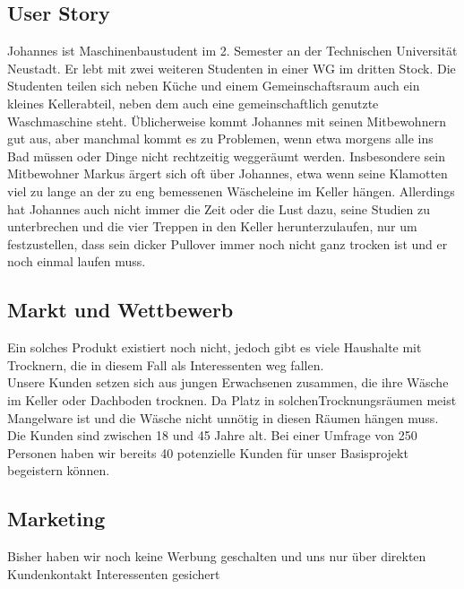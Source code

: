 \subsection{User Story}
	Johannes ist Maschinenbaustudent im 2. Semester an der Technischen Universität Neustadt. Er lebt mit zwei weiteren Studenten in einer WG im dritten Stock. Die Studenten teilen sich neben Küche und einem Gemeinschaftsraum auch ein kleines Kellerabteil, neben dem auch eine gemeinschaftlich genutzte Waschmaschine steht. Üblicherweise kommt Johannes mit seinen Mitbewohnern gut aus, aber manchmal kommt es zu Problemen, wenn etwa morgens alle ins Bad müssen oder Dinge nicht rechtzeitig weggeräumt werden. Insbesondere sein Mitbewohner Markus ärgert sich oft über Johannes, etwa wenn seine Klamotten viel zu lange an der zu eng bemessenen Wäscheleine im Keller hängen. Allerdings hat Johannes auch nicht immer die Zeit oder die Lust dazu, seine Studien zu unterbrechen und die vier Treppen in den Keller herunterzulaufen, nur um festzustellen, dass sein dicker Pullover immer noch nicht ganz trocken ist und er noch einmal laufen muss.

\subsection{Markt und Wettbewerb}
	Ein solches Produkt existiert noch nicht, jedoch gibt es viele Haushalte mit Trocknern, die in diesem Fall als Interessenten weg fallen. \\

	Unsere Kunden setzen sich aus jungen Erwachsenen zusammen, die ihre Wäsche im Keller oder Dachboden trocknen. Da Platz in solchenTrocknungsräumen meist Mangelware ist und die Wäsche nicht unnötig in diesen Räumen hängen muss. Die Kunden sind zwischen 18 und 45 Jahre alt. Bei einer Umfrage von 250 Personen haben wir bereits 40 potenzielle Kunden für unser Basisprojekt begeistern können.

\subsection{Marketing}
		Bisher haben wir noch keine Werbung geschalten und uns nur über direkten Kundenkontakt Interessenten gesichert

